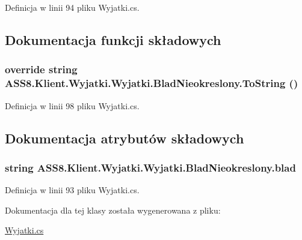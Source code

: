 Definicja w linii 94 pliku Wyjatki.cs.

\subsection{Dokumentacja funkcji składowych}
\hypertarget{a00031_ee38a23a4d2e7d8436ac4675b090ba85}{
\subsubsection[{ToString}]{\setlength{\rightskip}{0pt plus 5cm}override string ASS8.Klient.Wyjatki.Wyjatki.BladNieokreslony.ToString ()}}
\label{df/d61/a00031_ee38a23a4d2e7d8436ac4675b090ba85}




Definicja w linii 98 pliku Wyjatki.cs.

\subsection{Dokumentacja atrybutów składowych}
\hypertarget{a00031_bd1fe8688d61cbad9c7349a6336da357}{
\subsubsection[{blad}]{\setlength{\rightskip}{0pt plus 5cm}string ASS8.Klient.Wyjatki.Wyjatki.BladNieokreslony.blad}}
\label{df/d61/a00031_bd1fe8688d61cbad9c7349a6336da357}




Definicja w linii 93 pliku Wyjatki.cs.

Dokumentacja dla tej klasy została wygenerowana z pliku:\begin{CompactItemize}
\item 
\hyperlink{a00053}{Wyjatki.cs}\end{CompactItemize}
